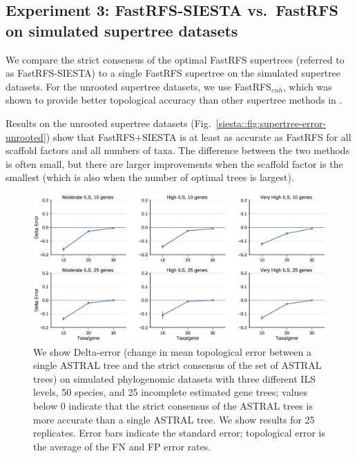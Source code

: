 \subsection{Experiment 3: FastRFS-SIESTA vs.~FastRFS on simulated supertree datasets }
We compare the strict consensus of the optimal FastRFS  supertrees (referred to as FastRFS-SIESTA) to a single FastRFS supertree on the simulated supertree datasets.
For the unrooted supertree datasets, we use FastRFS$_{enh}$, which was shown to provide better topological accuracy than other supertree methods in \cite{vachaspati2017fastrfs}.

Results on the unrooted supertree datasets  (Fig.~\ref{siesta::fig:supertree-error-unrooted}) show that 
FastRFS+SIESTA is at least as accurate as FastRFS for all scaffold factors and all numbers of taxa.
The difference between the  two methods is often small, but there are larger improvements when the scaffold factor is the smallest (which is also when the number of optimal trees is largest).

\begin{figure}[ht]
  \centering
 \includegraphics[width=.9\textwidth]{siesta-figs/astral_missing_delta_error}
  \caption[Change in topological error between ASTRAL and the SIESTA strict consensus of ASTRAL trees on simulated data, varying ILS level and number of genes]{
We show Delta-error (change in mean topological error between a single ASTRAL tree and the strict consensus of  the set of ASTRAL trees) on simulated phylogenomic datasets with three different ILS levels, 50 species,  and 25 incomplete estimated gene trees; values below 0 indicate that the strict consensus of the ASTRAL trees is more accurate  than a single ASTRAL tree.
 We show results for 25 replicates.
Error bars indicate the standard error; 
  topological error is the average of the FN and FP error rates.
  }
    \label{siesta::fig:astral-error}
\end{figure}


